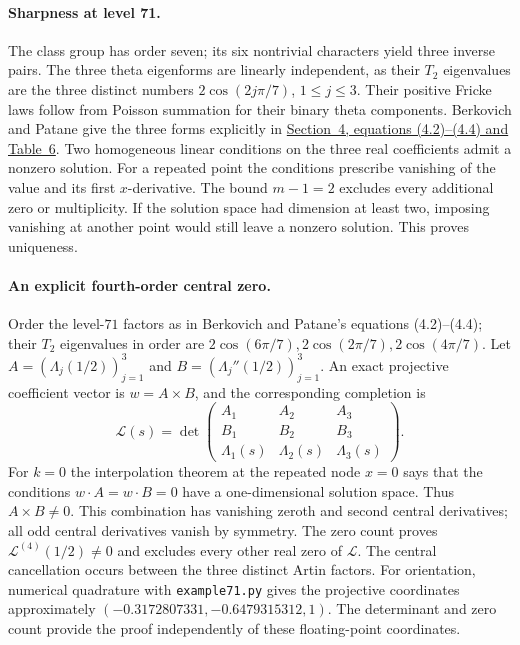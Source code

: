 \paragraph{Sharpness at level 71.}
The class group has order seven; its six nontrivial characters yield
three inverse pairs. The three theta eigenforms are linearly independent,
as their $T_2$ eigenvalues are the three distinct numbers
$2\cos(2j\pi/7)$, $1\le j\le3$. Their positive Fricke laws follow from
Poisson summation for their binary theta components.
Berkovich and Patane give the three forms explicitly in
\href{https://arxiv.org/pdf/1302.2359}{Section~4, equations (4.2)--(4.4) and Table~6}.
Two homogeneous linear conditions on the three real coefficients admit
a nonzero solution. For a repeated point the conditions prescribe
vanishing of the value and its first $x$-derivative. The bound $m-1=2$
excludes every additional zero or multiplicity. If the solution space
had dimension at least two, imposing vanishing at another point would
still leave a nonzero solution. This proves uniqueness.

\paragraph{An explicit fourth-order central zero.}
Order the level-$71$ factors as in Berkovich and Patane's equations
(4.2)--(4.4); their $T_2$ eigenvalues in order are
$2\cos(6\pi/7),2\cos(2\pi/7),2\cos(4\pi/7)$.
Let $A=(\Lambda_j(1/2))_{j=1}^3$ and
$B=(\Lambda_j''(1/2))_{j=1}^3$. An exact projective coefficient vector
is $w=A\times B$, and the corresponding completion is
\[
 \mathcal L(s)=\det\begin{pmatrix}
    A_1&A_2&A_3\\ B_1&B_2&B_3\\
    \Lambda_1(s)&\Lambda_2(s)&\Lambda_3(s)
 \end{pmatrix}.
\]
For $k=0$ the interpolation theorem at the repeated node $x=0$ says
that the conditions $w\cdot A=w\cdot B=0$ have a one-dimensional solution
space. Thus $A\times B\ne0$. This combination has vanishing zeroth
and second central derivatives; all odd central derivatives vanish by
symmetry. The zero count proves $\mathcal L^{(4)}(1/2)\ne0$ and excludes every
other real zero of $\mathcal L$. The central cancellation occurs between
the three distinct Artin factors. For orientation, numerical quadrature
with \texttt{example71.py} gives the projective coordinates approximately
$(-0.3172807331,-0.6479315312,1)$. The determinant and zero count provide the
proof independently of these floating-point coordinates.
